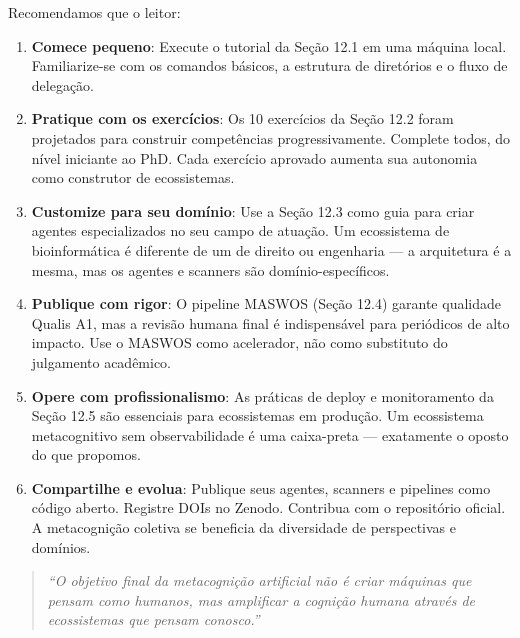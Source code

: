 Recomendamos que o leitor:

\begin{enumerate}
  \item \textbf{Comece pequeno}: Execute o tutorial da Seção 12.1 em uma máquina local. Familiarize-se com os comandos básicos, a estrutura de diretórios e o fluxo de delegação.
  
  \item \textbf{Pratique com os exercícios}: Os 10 exercícios da Seção 12.2 foram projetados para construir competências progressivamente. Complete todos, do nível iniciante ao PhD. Cada exercício aprovado aumenta sua autonomia como construtor de ecossistemas.
  
  \item \textbf{Customize para seu domínio}: Use a Seção 12.3 como guia para criar agentes especializados no seu campo de atuação. Um ecossistema de bioinformática é diferente de um de direito ou engenharia — a arquitetura é a mesma, mas os agentes e scanners são domínio-específicos.
  
  \item \textbf{Publique com rigor}: O pipeline MASWOS (Seção 12.4) garante qualidade Qualis A1, mas a revisão humana final é indispensável para periódicos de alto impacto. Use o MASWOS como acelerador, não como substituto do julgamento acadêmico.
  
  \item \textbf{Opere com profissionalismo}: As práticas de deploy e monitoramento da Seção 12.5 são essenciais para ecossistemas em produção. Um ecossistema metacognitivo sem observabilidade é uma caixa-preta — exatamente o oposto do que propomos.
  
  \item \textbf{Compartilhe e evolua}: Publique seus agentes, scanners e pipelines como código aberto. Registre DOIs no Zenodo. Contribua com o repositório oficial. A metacognição coletiva se beneficia da diversidade de perspectivas e domínios.
\end{enumerate}

\begin{quote}
\textit{``O objetivo final da metacognição artificial não é criar máquinas que pensam como humanos, mas amplificar a cognição humana através de ecossistemas que pensam conosco.''}
\end{quote}


